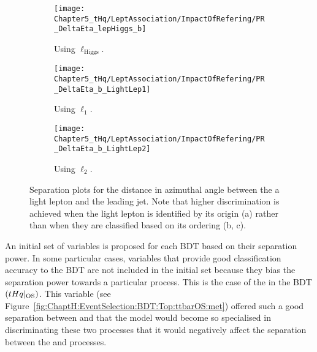 \begin{figure}[h]
  \centering  
  \begin{subfigure}[b]{0.31\textwidth}
    \centering
    \texttt{[image: Chapter5\_tHq/LeptAssociation/ImpactOfRefering/PR\_DeltaEta\_lepHiggs\_b]}
    \caption{Using $\ell_{\text{Higgs}}$.} %
     \label{fig:ChaptH:EventSelection:BDT:Variables:LeptonNaming:Hggs}
  \end{subfigure}
  \hfill
  \begin{subfigure}[b]{0.31\textwidth}
    \centering
    \texttt{[image: Chapter5\_tHq/LeptAssociation/ImpactOfRefering/PR\_DeltaEta\_b\_LightLep1]}
   \caption{Using $\ell_{1}$.} %
     \label{fig:ChaptH:EventSelection:BDT:Variables:LeptonNaming:L1}
  \end{subfigure}
    \hfill
  \begin{subfigure}[b]{0.31\textwidth}
    \centering
    \texttt{[image: Chapter5\_tHq/LeptAssociation/ImpactOfRefering/PR\_DeltaEta\_b\_LightLep2]}
    \caption{Using $\ell_{2}$.} %
     \label{fig:ChaptH:EventSelection:BDT:Variables:LeptonNaming:L2}
  \end{subfigure}
  \caption{Separation plots for the distance in azimuthal angle between the a light lepton and the leading \btagged jet.
  Note that higher discrimination is achieved when the light lepton is identified by its origin (a) rather than when they
  are classified based on its \pT ordering (b, c).}
  \label{fig:ChaptH:EventSelection:BDT:Variables:LeptonNaming}
\end{figure}


An initial set of variables is proposed for each BDT based on their separation power.
In some particular cases, variables that provide good classification accuracy to the BDT are 
not included in the initial set because they bias the separation power towards a particular process. This is the case of the \MET in the BDT$(tHq|_{\text{OS}})$. This variable 
(see Figure~\ref{fig:ChaptH:EventSelection:BDT:Top:ttbarOS:met}) offered such a good
separation between \Zjets and \tHq that the model would become so specialised in discriminating
these two processes that it would negatively affect the separation between the \tHq and \ttbar processes.

